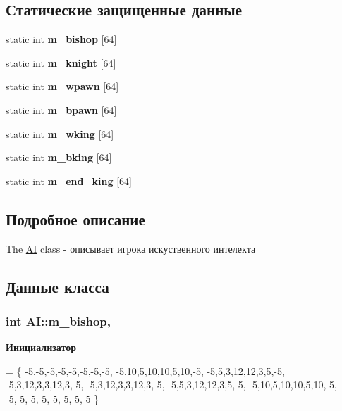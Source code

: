 \subsection*{Статические защищенные данные}
\begin{DoxyCompactItemize}
\item 
static int {\bfseries m\+\_\+bishop} \mbox{[}64\mbox{]}
\item 
static int {\bfseries m\+\_\+knight} \mbox{[}64\mbox{]}
\item 
static int {\bfseries m\+\_\+wpawn} \mbox{[}64\mbox{]}
\item 
static int {\bfseries m\+\_\+bpawn} \mbox{[}64\mbox{]}
\item 
static int {\bfseries m\+\_\+wking} \mbox{[}64\mbox{]}
\item 
static int {\bfseries m\+\_\+bking} \mbox{[}64\mbox{]}
\item 
static int {\bfseries m\+\_\+end\+\_\+king} \mbox{[}64\mbox{]}
\end{DoxyCompactItemize}


\subsection{Подробное описание}
The \hyperlink{class_a_i}{A\+I} class -\/ описывает игрока искуственного интелекта 

\subsection{Данные класса}
\hypertarget{class_a_i_ab749c006dc52480c5a9a00d17318e533}{}
\subsubsection[{m\+\_\+bishop}]{\setlength{\rightskip}{0pt plus 5cm}int A\+I\+::m\+\_\+bishop\hspace{0.3cm}{\ttfamily [static]}, {\ttfamily [protected]}}\label{class_a_i_ab749c006dc52480c5a9a00d17318e533}
{\bfseries Инициализатор}
\begin{DoxyCode}
= \{
    -5,-5,-5,-5,-5,-5,-5,-5,
    -5,10,5,10,10,5,10,-5,
    -5,5,3,12,12,3,5,-5,
    -5,3,12,3,3,12,3,-5,
    -5,3,12,3,3,12,3,-5,
    -5,5,3,12,12,3,5,-5,
    -5,10,5,10,10,5,10,-5,
    -5,-5,-5,-5,-5,-5,-5,-5 \}
\end{DoxyCode}
\hypertarget{class_a_i_a816338121fb591918d66bdefb4cda805}{}
